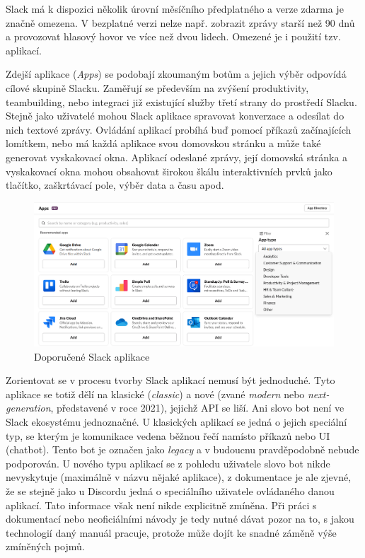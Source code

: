 \documentclass[FM]{tulthesis}
\begin{document}
	Slack má k dispozici několik úrovní měsíčního předplatného a verze zdarma je značně omezena. V bezplatné verzi nelze např. zobrazit zprávy starší než 90 dnů a provozovat hlasový hovor ve více než dvou lidech. Omezené je i použití tzv. aplikací.
	
	Zdejší aplikace (\textit{Apps}) se podobají zkoumaným botům a jejich výběr odpovídá cílové skupině Slacku. Zaměřují se především na zvýšení produktivity, \mbox{teambuilding}, nebo integraci již existující služby třetí strany do prostředí Slacku. Stejně jako uživatelé mohou Slack aplikace spravovat konverzace a odesílat do nich textové zprávy. Ovládání aplikací probíhá buď pomocí příkazů začínajících lomítkem, nebo má každá aplikace svou domovskou stránku a může také generovat vyskakovací okna. Aplikací odeslané zprávy, její domovská stránka a vyskakovací okna mohou obsahovat širokou škálu interaktivních prvků jako tlačítko, zaškrtávací pole, výběr data a času apod.
	
	\begin{figure}[ht]
		\centering
		\includegraphics[width=\textwidth]{img/SlackApps}
		\caption{Doporučené Slack aplikace}
	\end{figure}
	
	Zorientovat se v procesu tvorby Slack aplikací nemusí být jednoduché. Tyto aplikace se totiž dělí na klasické (\textit{classic}) a nové (zvané \textit{modern} nebo \textit{next-generation}, představené v roce 2021), jejichž API se liší. Ani slovo bot není ve Slack ekosystému jednoznačné. U klasických aplikací se jedná o jejich speciální typ, se kterým je komunikace vedena běžnou řečí namísto příkazů nebo UI (chatbot). Tento bot je označen jako \textit{legacy} a v budoucnu pravděpodobně nebude podporován. U nového typu aplikací se z pohledu uživatele slovo bot nikde nevyskytuje (maximálně v názvu nějaké aplikace), z dokumentace je ale zjevné, že se stejně jako u Discordu jedná o speciálního uživatele ovládaného danou aplikací. Tato informace však není nikde explicitně zmíněna. Při práci s dokumentací nebo neoficiálními návody je tedy nutné dávat pozor na to, s jakou technologií daný manuál pracuje, protože může dojít ke snadné záměně výše zmíněných pojmů.
	
\end{document}
